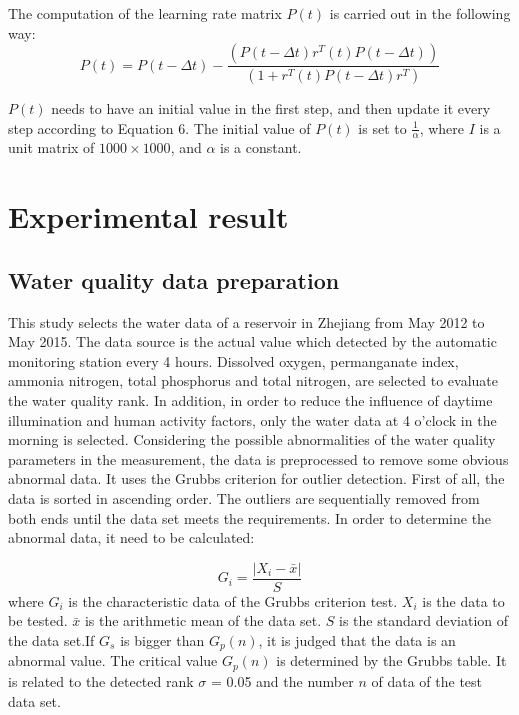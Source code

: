 \documentclass[runningheads]{llncs}
\begin{document}
The computation of the learning rate matrix $P(t)$ is carried out in the following way:
\begin{equation}
P(t)  = P(t-\Delta t)-  \frac{(P(t-\Delta t) r^T (t)P(t-\Delta t))}{(1+r^T (t)P(t-\Delta t) r^T )}
\end{equation}

$P(t)$ needs to have an initial value in the first step,  
and then update it every step according to Equation 6. 
The initial value of $P(t)$ is set to $\frac{1}{\alpha}$, where $I$ is a unit matrix of $1000\times 1000$,
and $\alpha$ is a constant.


\section{Experimental result}
\subsection{Water quality data preparation}
This study selects the water data of a reservoir in Zhejiang 
from May 2012 to May 2015. The data source is the actual value
which detected by the automatic monitoring station every 4 hours.
Dissolved oxygen, permanganate index, ammonia nitrogen, total phosphorus
and total nitrogen, are selected to evaluate the water quality rank. 
In addition, in order to reduce the influence of daytime illumination 
and human activity factors, only the water data at 4 o'clock 
in the morning  is selected. 
Considering the possible abnormalities of the water quality 
parameters in the measurement, the data is preprocessed to remove 
some obvious abnormal data. It uses the Grubbs criterion for outlier 
detection. First of all, the data is sorted in ascending order. 
The outliers are sequentially removed from both ends until the data 
set meets the requirements. In order to determine the abnormal data, 
it need to be calculated:

\begin{equation}
G_i=\frac{\left|X_i- \bar x \right|}{S}   
\end{equation}
where $G_i$ is the characteristic data of the Grubbs criterion test.
$X_i$ is the data to be tested. $\bar x$ is the arithmetic mean of the data set. 
$S$ is the standard deviation of the data set.If $G_s$ is bigger than $G_p (n)$, 
it is judged that the data is an abnormal value. 
The critical value $G_p (n)$ is determined by the Grubbs table. 
It is related to the detected rank $\sigma$ = 0.05 
and the number $n$ of data of the test data set.
\end{document}
